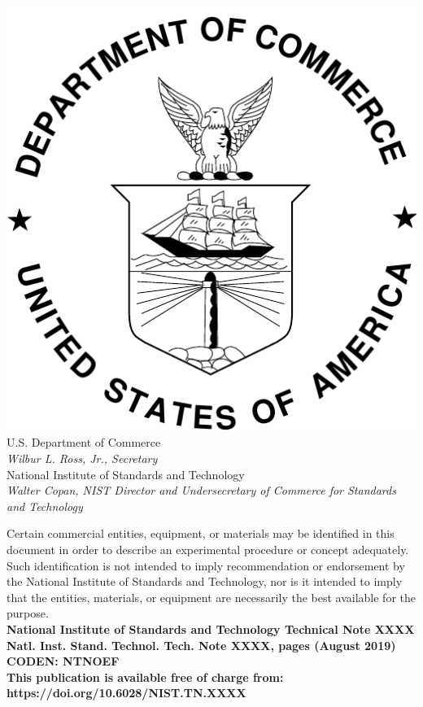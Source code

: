 \documentclass[12pt]{article}
\newcommand{\pubnumber}{XXXX}
\newcommand{\DOI}{https://doi.org/10.6028/NIST.TN.XXXX}
\newcommand{\monthyear}{August 2019}
\begin{document}
\begin{titlepage}
\begin{flushright}
\includegraphics[width=0.18\linewidth]{DoC-logo}\\ 
\vfill
\footnotesize U.S. Department of Commerce\\
\textit{Wilbur L. Ross, Jr., Secretary}\\
\vspace{10pt}
National Institute of Standards and Technology\\
\textit{Walter Copan, NIST Director and Undersecretary of Commerce for Standards and Technology}
\end{flushright}
\end{titlepage}

\begin{titlepage}
\begin{flushright}
\footnotesize  Certain commercial entities, equipment, or materials may be identified in this document in order to describe an experimental procedure or concept adequately. Such identification is not intended to imply recommendation or endorsement by the National Institute of Standards and Technology, nor is it intended to imply that the entities, materials, or equipment are necessarily the best available for the purpose.\\ 
\vfill
\normalsize \textbf{National Institute of Standards and Technology Technical Note \pubnumber\\ 
Natl. Inst. Stand. Technol. Tech. Note \pubnumber, \pageref{LastPage} pages (\monthyear)} \\
\textbf{CODEN: NTNOEF}\\
\vspace{12pt}
\textbf{This publication is available free of charge from: \DOI}
\vfill
\end{flushright}
\end{titlepage}
\end{document}
